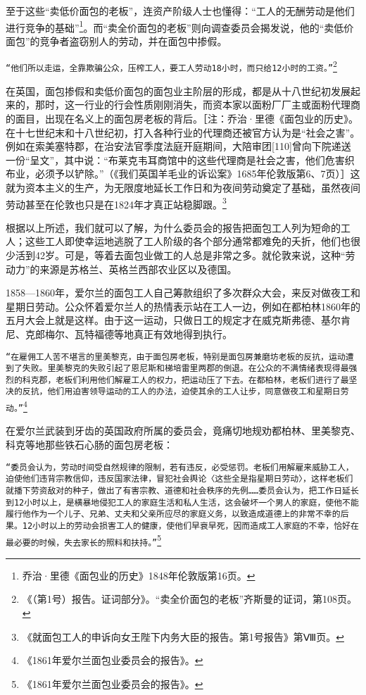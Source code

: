 \documentclass{ctexbook}
\begin{document}
    至于这些“卖低价面包的老板”，连资产阶级人士也懂得：“工人的无酬劳动是他们进行竞争的基础”\footnote{乔治·里德《面包业的历史》1848年伦敦版第16页。}。而“卖全价面包的老板”则向调查委员会揭发说，他的“卖低价面包”的竞争者盗窃别人的劳动，并在面包中掺假。

    \texttt{“他们所以走运，全靠欺骗公众，压榨工人，要工人劳动18小时，而只给12小时的工资。”}\footnote{《（第1号）报告。证词部分》。“卖全价面包的老板”齐斯曼的证词，第108页。}

    在英国，面包掺假和卖低价面包的面包业主阶层的形成，都是从十八世纪初发展起来的，那时，这一行业的行会性质刚刚消失，而资本家以面粉厂厂主或面粉代理商的面目，出现在名义上的面包房老板的背后。［注：乔治·里德《面包业的历史》。在十七世纪末和十八世纪初，打入各种行业的代理商还被官方认为是“社会之害”。例如在索美塞特郡，在治安法官季度法庭开庭期间，大陪审团[110]曾向下院递送一份“呈文”，其中说：“布莱克韦耳商馆中的这些代理商是社会之害，他们危害织布业，必须予以铲除。”（《我们英国羊毛业的诉讼案》1685年伦敦版第6、7页）］这就为资本主义的生产，为无限度地延长工作日和为夜间劳动奠定了基础，虽然夜间劳动甚至在伦敦也只是在1824年才真正站稳脚跟。\footnote{《就面包工人的申诉向女王陛下内务大臣的报告。第1号报告》第Ⅷ页。}

    根据以上所述，我们就可以了解，为什么委员会的报告把面包工人列为短命的工人；这些工人即使幸运地逃脱了工人阶级的各个部分通常都难免的夭折，他们也很少活到42岁。可是，等着去面包业做工的人总是非常之多。就伦敦来说，这种“劳动力”的来源是苏格兰、英格兰西部农业区以及德国。

    1858—1860年，爱尔兰的面包工人自己筹款组织了多次群众大会，来反对做夜工和星期日劳动。公众怀着爱尔兰人的热情表示站在工人一边，例如在都柏林1860年的五月大会上就是这样。由于这一运动，只做日工的规定才在威克斯弗德、基尔肯尼、克郎梅尔、瓦特福德等地真正有效地得到执行。

    \texttt{“在雇佣工人苦不堪言的里美黎克，由于面包房老板，特别是面包房兼磨坊老板的反抗，运动遭到了失败。里美黎克的失败引起了恩尼斯和梯培雷里两郡的倒退。在公众的不满情绪表现得最强烈的科克郡，老板们利用他们解雇工人的权力，把运动压了下去。在都柏林，老板们进行了最坚决的反抗，他们用迫害领导运动的工人的办法，迫使其余的工人让步，同意做夜工和星期日劳动。”}\footnote{《1861年爱尔兰面包业委员会的报告》。}

    在爱尔兰武装到牙齿的英国政府所属的委员会，竟痛切地规劝都柏林、里美黎克、科克等地那些铁石心肠的面包房老板：

    \texttt{“委员会认为，劳动时间受自然规律的限制，若有违反，必受惩罚。老板们用解雇来威胁工人，迫使他们违背宗教信仰，违反国家法律，冒犯社会舆论〈这些全是指星期日劳动〉，这样老板们就播下劳资敌对的种子，做出了有害宗教、道德和社会秩序的先例……委员会认为，把工作日延长到12小时以上，是横暴地侵犯工人的家庭生活和私人生活，这会破坏一个男人的家庭，使他不能履行他作为一个儿子、兄弟、丈夫和父亲所应尽的家庭义务，以致造成道德上的非常不幸的后果。12小时以上的劳动会损害工人的健康，使他们早衰早死，因而造成工人家庭的不幸，恰好在最必要的时候，失去家长的照料和扶持。”}\footnote{《1861年爱尔兰面包业委员会的报告》。}
\end{document}
